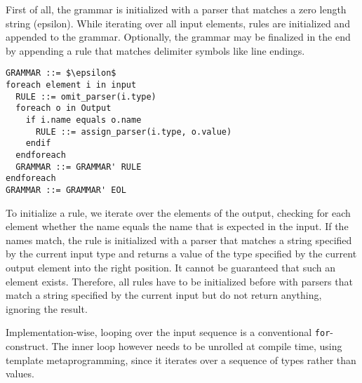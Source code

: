 First of all, the grammar is initialized with a parser that matches a zero
length string (epsilon). While iterating over all input elements, rules are
initialized and appended to the grammar. Optionally, the grammar may be
finalized in the end by appending a rule that matches delimiter symbols like
line endings.

\begin{lstlisting}[mathescape, frame=tb, label=algorithm,
                   caption=grammar construction algorithm]
GRAMMAR ::= $\epsilon$
foreach element i in input
  RULE ::= omit_parser(i.type)
  foreach o in Output
    if i.name equals o.name
      RULE ::= assign_parser(i.type, o.value)
    endif
  endforeach
  GRAMMAR ::= GRAMMAR' RULE
endforeach
GRAMMAR ::= GRAMMAR' EOL
\end{lstlisting}

To initialize a rule, we iterate over the elements of the output, checking for
each element whether the name equals the name that is expected in the input. If
the names match, the rule is initialized with a parser that matches a string
specified by the current input type and returns a value of the type specified by
the current output element into the right position. It cannot be guaranteed that
such an element exists. Therefore, all rules have to be initialized before with
parsers that match a string specified by the current input but do not return
anything, ignoring the result.

Implementation-wise, looping over the input sequence is a conventional
\texttt{for}-construct. The inner loop however needs to be unrolled at compile
time, using template metaprogramming, since it iterates over a sequence of types
rather than values.

